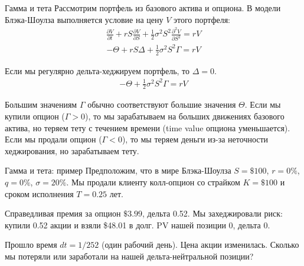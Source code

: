 \documentclass{beamer}
\begin{document}
\begin{frame}{Гамма и тета}
\justify
Рассмотрим портфель из базового актива и опциона. В модели Блэка-Шоулза выполняется условие на цену $V$ этого портфеля:
\begin{align*}
\frac{\partial V}{\partial t} + rS\frac{\partial V}{\partial S} + \frac{1}{2}\sigma^2S^2\frac{\partial^2 V}{\partial S^2} = rV
\end{align*}
\begin{align*}
-\Theta + rS\Delta + \frac{1}{2}\sigma^2S^2\Gamma = rV
\end{align*}

Если мы регулярно дельта-хеджируем портфель, то $\Delta=0$.
\begin{align*}
-\Theta + \frac{1}{2}\sigma^2S^2\Gamma = rV
\end{align*}

\justify
Большим значениям $\Gamma$ обычно соответствуют большие значения $\Theta$. Если мы купили опцион ($\Gamma > 0$), то мы зарабатываем на больших движениях базового актива, но теряем тету с течением времени (time value опциона уменьшается). Если мы продали опцион ($\Gamma < 0$), то мы теряем деньги из-за неточности хеджирования, но зарабатываем тету.
\end{frame}



\begin{frame}{Гамма и тета: пример}
\justify
Предположим, что в мире Блэка-Шоулза $S=\$100$, $r=0\%$, $q=0\%$, $\sigma=20\%$. Мы 
\alert{продали} клиенту колл-опцион со страйком $K=\$100$ и сроком исполнения $T=0.25$ 
лет.

\justify
Справедливая премия за опцион $\$3.99$, дельта 0.52. Мы захеджировали риск: купили
0.52 акции и взяли \$48.01 в долг. PV нашей позиции 0, дельта 0. 

\justify
Прошло время $dt = 1/252$ (один рабочий день). Цена акции изменилась. Сколько мы потеряли или заработали на нашей дельта-нейтральной позиции?
\end{frame}
\end{document}
